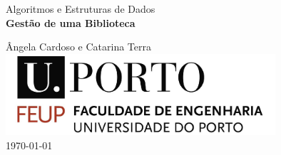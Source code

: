 

\begin{titlepage}
\begin{center}
 
\vspace*{3cm}

{\Large Algoritmos e Estruturas de Dados}\\[2cm]

{\Huge \bfseries Gestão de uma Biblioteca \\[2cm]}

{\large Ângela Cardoso e Catarina Terra}\\[2cm]

\includegraphics[width=10cm]{feup_logo.jpg}\\[2cm]


{\large \today}

\end{center}
\end{titlepage}